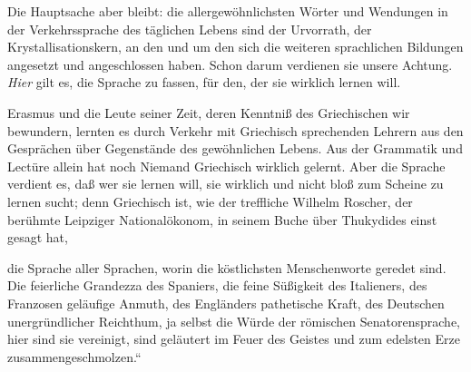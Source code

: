 Die Hauptsache aber bleibt: die allergewöhnlichsten Wörter und Wendungen
in der Ver\textcompwordmark{}kehrs\textcompwordmark{}sprache des
täglichen Lebens sind der Urvorrath, der Krystallisations\textcompwordmark{}kern,
an den und um den sich die weiteren sprachlichen Bildungen angesetzt
und angeschlossen haben. Schon darum verdienen sie unsere Achtung.
\emph{Hier} gilt es, die Sprache zu fassen, für den, der sie wirklich
lernen will.

Eras\textcompwordmark{}mus und die Leute seiner Zeit, deren Kenntniß
des Griechischen wir bewundern, lernten es durch Ver\textcompwordmark{}kehr
mit Griechisch sprechenden Lehrern aus den Gesprächen über Gegenstände
des gewöhnlichen Lebens. Aus der Grammatik und Lectüre allein hat
noch Niemand Griechisch wirklich gelernt. Aber die Sprache verdient
es, daß wer sie lernen will, sie wirklich und nicht bloß zum Scheine
zu lernen sucht; denn Griechisch ist, wie der treffliche Wilhelm
Roscher, der berühmte Leipziger Nationalökonom, in seinem Buche über
Thukydides einst gesagt hat,

\begin{quotedquotation}\noindent die Sprache aller Sprachen, worin
die köstlichsten Menschenworte geredet sind. Die feierliche Grandezza
des Spaniers, die feine Süßigkeit des Italieners, des Franzosen geläufige
Anmuth, des Engländers pathetische Kraft, des Deutschen unergründlicher
Reichthum, ja selbst die Würde der römischen Senatorensprache, hier
sind sie vereinigt, sind geläutert im Feuer des Geistes und zum edelsten
Erze zusammengeschmolzen.\unskip``\end{quotedquotation} 
